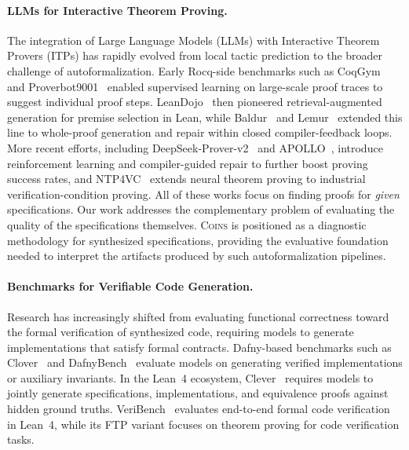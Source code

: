 \documentclass{article}
\theoremstyle{plain}
\theoremstyle{definition}
\theoremstyle{remark}
\begin{document}
\paragraph{LLMs for Interactive Theorem Proving.}
The integration of Large Language Models (LLMs) with Interactive Theorem Provers (ITPs) has rapidly evolved from local tactic prediction to the broader challenge of autoformalization. Early Rocq-side benchmarks such as CoqGym~\cite{yang2019learning} and Proverbot9001~\cite{sanchez2020generating} enabled supervised learning on large-scale proof traces to suggest individual proof steps. LeanDojo~\cite{yang2023leandojo} then pioneered retrieval-augmented generation for premise selection in Lean, while Baldur~\cite{first2023baldur} and Lemur~\cite{wu2024lemur} extended this line to whole-proof generation and repair within closed compiler-feedback loops. More recent efforts, including DeepSeek-Prover-v2~\cite{ren2025deepseek} and APOLLO~\cite{ospanov2026apollo}, introduce reinforcement learning and compiler-guided repair to further boost proving success rates, and NTP4VC~\cite{xu2026neural} extends neural theorem proving to industrial verification-condition proving. All of these works focus on finding proofs for \emph{given} specifications. Our work addresses the complementary problem of evaluating the quality of the specifications themselves. \textsc{Coins} is positioned as a diagnostic methodology for synthesized specifications, providing the evaluative foundation needed to interpret the artifacts produced by such autoformalization pipelines.

\paragraph{Benchmarks for Verifiable Code Generation.}
Research has increasingly shifted from evaluating functional correctness toward the formal verification of synthesized code, requiring models to generate implementations that satisfy formal contracts. Dafny-based benchmarks such as Clover~\cite{sun2024clover} and DafnyBench~\cite{loughridge2025dafnybench} evaluate models on generating verified implementations or auxiliary invariants. In the Lean~4 ecosystem, Clever~\cite{thakur2025clever} requires models to jointly generate specifications, implementations, and equivalence proofs against hidden ground truths. VeriBench~\cite{miranda2026veribench} evaluates end-to-end formal code verification in Lean~4, while its FTP variant focuses on theorem proving for code verification tasks.
\end{document}
